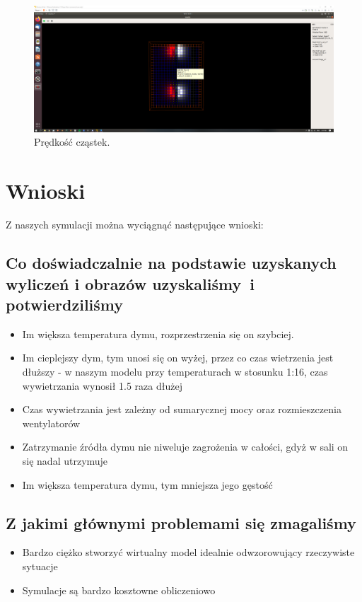 \documentclass{article}
\begin{document}
	\vspace{15mm}
	\begin{figure}[ht!]
		\centering
		\medskip
		\medskip
		\medskip
		\includegraphics[scale = 0.165]{mgui_2.png}
		\caption{Prędkość cząstek.}
	\end{figure}
	
	\pagebreak
	
	\vspace{12mm}
	\section{Wnioski}
	Z naszych symulacji można wyciągnąć następujące wnioski:
	
	\subsection{Co doświadczalnie na podstawie uzyskanych wyliczeń i obrazów uzyskaliśmy~i potwierdziliśmy}
	\begin{itemize}
		\item Im większa temperatura dymu, rozprzestrzenia się on szybciej.
		\item Im cieplejszy dym, tym unosi się on wyżej, przez co czas wietrzenia jest dłuższy - w naszym modelu przy temperaturach w stosunku 1:16, czas wywietrzania wynosił 1.5 raza dłużej
		\item Czas wywietrzania jest zależny od sumarycznej mocy oraz rozmieszczenia wentylatorów
		\item Zatrzymanie źródła dymu nie niweluje zagrożenia w całości, gdyż w sali on się nadal utrzymuje
		\item Im większa temperatura dymu, tym mniejsza jego gęstość
	\end{itemize}
	
	\subsection{Z jakimi głównymi problemami się zmagaliśmy}    
	\begin{itemize}   
		\item Bardzo ciężko stworzyć wirtualny model idealnie odwzorowujący rzeczywiste sytuacje
		\item Symulacje są bardzo kosztowne obliczeniowo
	\end{itemize}
	
\end{document}
